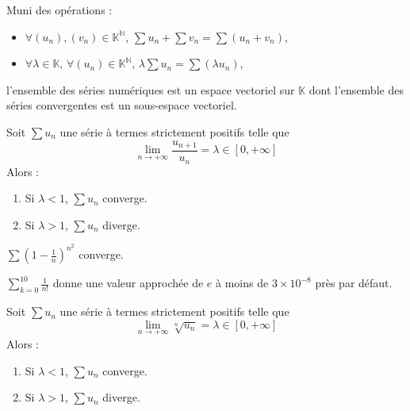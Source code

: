   \begin{proposition}
    Muni des opérations :
    \begin{itemize}
      \item $\forall (u_n), (v_n) \in \mathbb{K}^{\mathbb{N}}, \, \sum u_n + \sum v_n = \sum (u_n + v_n)$,
      \item $\forall \lambda \in \mathbb{K}, \, \forall (u_n) \in \mathbb{K}^{\mathbb{N}}, \, \lambda \sum u_n = \sum (\lambda u_n)$,
    \end{itemize}
    l'ensemble des séries numériques est un espace vectoriel sur $\mathbb{K}$ dont l'ensemble des séries convergentes est un sous-espace vectoriel.
  \end{proposition}


  \begin{proposition}
    Soit $\sum u_n$ une série à termes strictement positifs telle que
    \[ \lim_{n \rightarrow +\infty} \frac{u_{n+1}}{u_n} = \lambda \in [0, +\infty] \]
    Alors :
    \begin{enumerate}[label=(\roman*)]
      \item Si $\lambda < 1$, $\sum u_n$ converge.
      \item Si $\lambda > 1$, $\sum u_n$ diverge.
    \end{enumerate}
  \end{proposition}


  \begin{example}
    $\sum \left( 1 - \frac{1}{n} \right)^{n^2}$ converge.
  \end{example}


  \begin{example}
    $\sum_{k=0}^{10} \frac{1}{n!}$ donne une valeur approchée de $e$ à moins de $3 \times 10^{-8}$ près par défaut.
  \end{example}


  \begin{proposition}
    Soit $\sum u_n$ une série à termes strictement positifs telle que
    \[ \lim_{n \rightarrow +\infty} \sqrt[n]{u_n} = \lambda \in [0, +\infty] \]
    Alors :
    \begin{enumerate}[label=(\roman*)]
      \item Si $\lambda < 1$, $\sum u_n$ converge.
      \item Si $\lambda > 1$, $\sum u_n$ diverge.
    \end{enumerate}
  \end{proposition}

